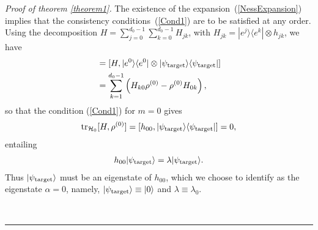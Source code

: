 \documentclass[aps,pra,letterpaper,twocolumn,showpacs,superscriptaddress,floatfix,longbibliography]{revtex4-1}
\newcommand{\traccazero}{\mathop{\mathrm{tr}_{\mathcal{H}_0}}\limits}
\newenvironment{proof}[1][Proof]{\noindent\textit{#1.} }{\
  \rule{0.5em}{0.5em}}
\begin{document}
\begin{proof}[Proof of theorem \ref{theorem1}]
  The existence of the expansion~(\ref{NessExpansion}) implies that
  the consistency conditions~(\ref{Cond1}) are to be satisfied at any
  order.  Using the decomposition $H =
  \sum_{j=0}^{d_0-1}\sum_{k=0}^{d_0-1} H_{jk}$, with $H_{jk} =
  |e^{j}\rangle \langle e^k | \otimes h_{jk}$, we have
  \begin{align} [H,\rho^{(0)}] &= [H,\ket{e^0}\bra{e^0} \otimes
    \ket{\psi_{\rm{target}}}\bra{\psi_{\rm{target}}}] \nonumber \\ &=
    \sum_{k=1}^{d_0-1}\left( H_{k0} \rho^{(0)} -\rho^{(0)} H_{0k}
    \right),
    \label{defQ1}
  \end{align}
  so that the condition (\ref{Cond1}) for $m=0$ gives
  \begin{align}
    \traccazero [H,\rho^{(0)}]=
    [h_{00},\ket{\psi_{\rm{target}}}\bra{\psi_{\rm{target}}} ]=0,
  \end{align}
  entailing
  \begin{align}
    h_{00}|{\psi_{\rm{target}}}\rangle = \lambda |{\psi_{\rm{target}}}\rangle.
    \label{Conditionh00}
  \end{align}
  Thus $|{\psi_{\rm{target}}}\rangle$ must be an eigenstate of $h_{00}$,
  which we choose to identify as the eigenstate $\alpha=0$, namely,
  $|{\psi_{\rm{target}}}\rangle \equiv |{0}\rangle$ and $\lambda \equiv
  \lambda_0$.


\end{proof}
\end{document}
